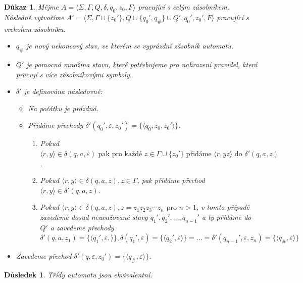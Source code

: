 \documentclass[10pt, a4paper, titlepage]{article}
\theoremstyle{note}
\newtheorem{dukaz}{Důkaz}
\newtheorem{dusledek}{Důsledek}
\begin{document}
\begin{dukaz}
Mějme $A = \langle \Sigma, \Gamma, Q, \delta, q_0, z_0, F \rangle$ pracující s celým zásobníkem. Následně vytvoříme
$A' = \langle \Sigma, \Gamma \cup \lbrace z_0' \rbrace, Q \cup \lbrace q_0', q_\# \rbrace \cup Q', q_0', z_0', F \rangle$ pracující s vrcholem
zásobníku.
\begin{itemize}
\item
$q_\#$ je nový nekoncový stav, ve kterém se vyprázdní zásobník automatu.

\item
$Q'$ je pomocná množina stavu, které potřebujeme pro nahrazení pravidel, která pracují s více zásobníkovými symboly.

\item
$\delta'$ je definována následovně:
\begin{itemize}
\item
Na počátku je prázdná.

\item
Přidáme přechody $\delta'(q_0', \varepsilon, z_0') = \lbrace \langle q_0, z_0, z_0' \rangle \rbrace$.
\begin{enumerate}
\item
Pokud $\langle r, y \rangle \in \delta(q, a, \varepsilon) \text{ pak pro každé } z \in \Gamma \cup \lbrace z_0' \rbrace \text{ přidáme }
\langle r, yz \rangle \text{ do } \delta'(q, a, z)$.

\item
Pokud $\langle r, y \rangle \in \delta(q, a, z), z \in \Gamma$, pak přidáme přechod $\langle r, y \rangle \in \delta'(q, a, z)$.

\item
Pokud $\langle r, y \rangle \in \delta(q, a, z), z = z_1z_2z_3 \cdots z_n \text{ pro } n > 1$, v tomto případě zavedeme dosud neuvažované stavy
$q_1',q_2',\ldots,q_{n-1}'$ a ty přidáme do $Q'$ a zavedeme přechody $\delta'(q, a, z_1) = \lbrace \langle q_1', \varepsilon, \rangle \rbrace,
\delta(q_1', \varepsilon) = \lbrace \langle q_2', \varepsilon \rangle \rbrace = \ldots = \delta'(q_{n-1}', \varepsilon, z_n) =
\lbrace \langle q_\#, \varepsilon \rangle \rbrace$
\end{enumerate}
\end{itemize}

\item
Zavedeme přechod $\delta'(q, \varepsilon, z_0') = \lbrace \langle q_\#, \varepsilon \rangle \rbrace$.
\end{itemize}
\end{dukaz}
\begin{dusledek}
Třídy automatu jsou ekvivalentní.
\end{dusledek}
\end{document}
